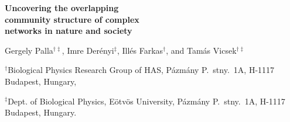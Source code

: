 \documentclass[11pt,a4paper]{article}
\begin{document}
\newcommand{\be}{\begin{equation}}
\newcommand{\ee}{\end{equation}}
\newcommand{\bea}{\begin{eqnarray}}
\newcommand{\eea}{\end{eqnarray}}
\newcommand{\f}{\frac}
\newcommand{\p}{\partial}
\newcommand{\no}{\nonumber}
\newcommand{\kT}{k_{\rm B}T}
\newcommand{\e}{{\rm e}}
\newcommand{\dd}{{\rm d}}

\newcommand{\eg}{\textit{e.g.}}
\newcommand{\ie}{\textit{i.e.}}
\newcommand{\etc}{\textit{etc}}

\newcommand{\comdeg}{d^{\rm com}}
\newcommand{\ovsize}{s^{\rm ov}}
\newcommand{\comsize}{s^{\rm com}}

\newcommand{\kav}{\left<k\right>}

\newcommand{\corr} {\color{red}}
\newcommand{\tamas}{\color{blue}}
\newcommand{\imre} {\color{green}}
\newcommand{\illes}{\color{magenta}}
\newcommand{\gergo}{\color{cyan}}
\newcommand{\misc} {\color[rgb]{.62,.32,.18}}   %

\begin{Large}
\begin{center}
\textbf{
Uncovering the overlapping\\
community structure of complex\\
networks in nature and society
}
\end{center}
\end{Large}

\medskip

\begin{large}
\begin{center}
Gergely Palla$^{\dagger\ddagger}$,
Imre Der\'enyi$^{\ddagger}$,
Ill\'es Farkas$^{\dagger}$, and
Tam\'as Vicsek$^{\dagger\ddagger}$
\end{center}
\end{large}

\bigskip

$^{\dagger}$Biological Physics Research Group of HAS,
 P\'azm\'any P.\ stny.\ 1A, H-1117 Budapest, Hungary,

$^{\ddagger}$Dept. of Biological Physics, E\"otv\"os University,
 P\'azm\'any P.\ stny.\ 1A, H-1117 Budapest, Hungary.

\end{document}
